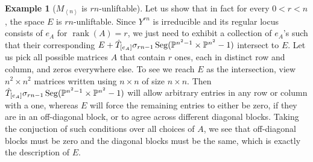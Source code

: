 \documentclass[a4paper,10pt]{article}
\def\gener#1{\left\langle#1\right\rangle}
\DeclareMathOperator{\rank}{rank}\let\rk\rank
\DeclareMathOperator{\Seg}{Seg}
\theoremstyle{definition}
\newtheorem{example}[theorem]{Example}
\theoremstyle{remark}
\begin{document}
\begin{example}[$M_{\gener n}$ is $rn$-unliftable]
    Let us show that in fact for every $0<r<n$, the space $E$ is $rn$-unliftable. Since $Y^{rn}$ is irreducible and its regular locus consists of $e_A$ for $\rank(A)=r$, we just need to exhibit a collection of $e_A$'s such that their corresponding $E+\hat T_{[e_A]}\sigma_{rn-1}\Seg(\pe^{n^2-1}\times\pe^{n^2}-1)$ intersect to $E$. Let us pick all possible matrices $A$ that contain $r$ ones, each in distinct row and column, and zeros everywhere else. To see we reach $E$ as the intersection, view $n^2\times n^2$ matrices written using $n\times n$ of size $n\times n$.
    Then $\hat T_{[e_A]}\sigma_{rn-1}\Seg(\pe^{n^2-1}\times\pe^{n^2}-1)$ will allow arbitrary entries in any row or column with a one, whereas $E$ will force the remaining entries to either be zero, if they are in an off-diagonal block, or to agree across different diagonal blocks. Taking the conjuction of such conditions over all choices of $A$, we see that off-diagonal blocks must be zero and the diagonal blocks must be the same, which is exactly the description of $E$.


\end{example}
\end{document}
